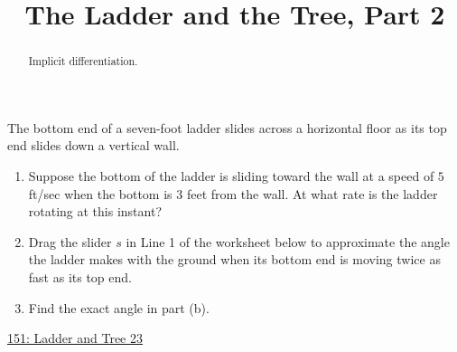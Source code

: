 \documentclass{ximera}
\title{The Ladder and the Tree, Part 2}
\begin{document}
\begin{abstract}
Implicit differentiation.
\end{abstract}
\maketitle

\begin{question}  \label{Qhfhghllllgg}
The bottom end of a seven-foot ladder slides across a horizontal floor as its top end slides down a vertical wall.

\begin{enumerate}

\item Suppose the bottom of the ladder is sliding toward the wall at a speed of $5$ ft/sec when the bottom is $3$ feet from the wall. At what rate is the ladder rotating at this instant?

\item Drag the slider $s$ in Line 1 of the worksheet below to approximate the angle the ladder makes with the ground when its bottom end is moving twice as fast as its top end.

\item Find the exact angle in part (b).
\end{enumerate}

 
\begin{onlineOnly}
   \begin{center}
\end{center}
\end{onlineOnly}

\href{https://www.desmos.com/calculator/mlulonqhoa}{151: Ladder and Tree 23}

\end{question}
\end{document}
